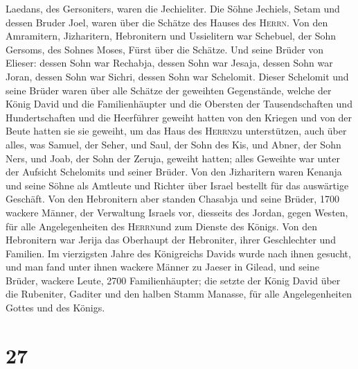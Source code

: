 Laedans, des Gersoniters, waren die Jechieliter.  Die
Söhne Jechiels, Setam und dessen Bruder Joel, waren über die Schätze des
Hauses des \textsc{Herrn}.  Von den Amramitern,
Jizharitern, Hebronitern und Ussielitern war Schebuel, 
der Sohn Gersoms, des Sohnes Moses, Fürst über die Schätze.
 Und seine Brüder von Elieser: dessen Sohn war Rechabja,
dessen Sohn war Jesaja, dessen Sohn war Joran, dessen Sohn war Sichri,
dessen Sohn war Schelomit.  Dieser Schelomit und seine
Brüder waren über alle Schätze der geweihten Gegenstände, welche der
König David und die Familienhäupter und die Obersten der Tausendschaften
und Hundertschaften und die Heerführer geweiht hatten 
von den Kriegen und von der Beute hatten sie sie geweiht, um das Haus
des \textsc{Herrn}zu unterstützen,  auch über alles, was
Samuel, der Seher, und Saul, der Sohn des Kis, und Abner, der Sohn Ners,
und Joab, der Sohn der Zeruja, geweiht hatten; alles Geweihte war unter
der Aufsicht Schelomits und seiner Brüder.  Von den
Jizharitern waren Kenanja und seine Söhne als Amtleute und Richter über
Israel bestellt für das auswärtige Geschäft.  Von den
Hebronitern aber standen Chasabja und seine Brüder, 1700 wackere Männer,
der Verwaltung Israels vor, diesseits des Jordan, gegen Westen, für alle
Angelegenheiten des \textsc{Herrn}und zum Dienste des Königs.
 Von den Hebronitern war Jerija das Oberhaupt der
Hebroniter, ihrer Geschlechter und Familien. Im vierzigsten Jahre des
Königreichs Davids wurde nach ihnen gesucht, und man fand unter ihnen
wackere Männer zu Jaeser in Gilead,  und seine Brüder,
wackere Leute, 2700 Familienhäupter; die setzte der König David über die
Rubeniter, Gaditer und den halben Stamm Manasse, für alle
Angelegenheiten Gottes und des Königs.

\hypertarget{section-26}{%
\section{27}\label{section-26}}

